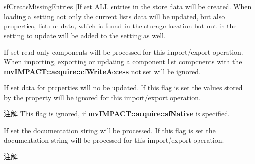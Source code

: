 \begin{Desc}
\begin{description}
{\hypertarget{group___common_interface_gga9390ccf3b2ebe68eee998798d59dc823a83a175df325530a5324a0f30f314a010}{sf\+Create\+Missing\+Entries}\label{group___common_interface_gga9390ccf3b2ebe68eee998798d59dc823a83a175df325530a5324a0f30f314a010}
}]If set A\+L\+L entries in the store data will be created. When loading a setting not only the current lists data will be updated, but also properties, lists or data, which is found in the storage location but not in the setting to update will be added to the setting as well. \item[{\em 
\hypertarget{group___common_interface_gga9390ccf3b2ebe68eee998798d59dc823ab8f2dca4c33dc32cd278eab0356682f1}{sf\+Process\+Read\+Only\+Components}\label{group___common_interface_gga9390ccf3b2ebe68eee998798d59dc823ab8f2dca4c33dc32cd278eab0356682f1}
}]If set read-\/only components will be processed for this import/export operation. When importing, exporting or updating a component list components with the {\bfseries mv\+I\+M\+P\+A\+C\+T\+::acquire\+::cf\+Write\+Access} not set will be ignored. \item[{\em 
\hypertarget{group___common_interface_gga9390ccf3b2ebe68eee998798d59dc823a64b5d2009c17632e428149ef5f73e4bb}{sf\+Ignore\+Prop\+Data}\label{group___common_interface_gga9390ccf3b2ebe68eee998798d59dc823a64b5d2009c17632e428149ef5f73e4bb}
}]If set data for properties will no be updated. If this flag is set the values stored by the property will be ignored for this import/export operation. \begin{DoxyNote}{注解}
This flag is ignored, if {\bfseries mv\+I\+M\+P\+A\+C\+T\+::acquire\+::sf\+Native} is specified. 
\end{DoxyNote}
\item[{\em 
\hypertarget{group___common_interface_gga9390ccf3b2ebe68eee998798d59dc823ac5656c3b4512f272143bcb749d039c5c}{sf\+Process\+Doc\+String}\label{group___common_interface_gga9390ccf3b2ebe68eee998798d59dc823ac5656c3b4512f272143bcb749d039c5c}
}]If set the documentation string will be processed. If this flag is set the documentation string will be processed for this import/export operation. \begin{DoxyNote}{注解}

\end{DoxyNote}
\end{description}
\end{Desc}
